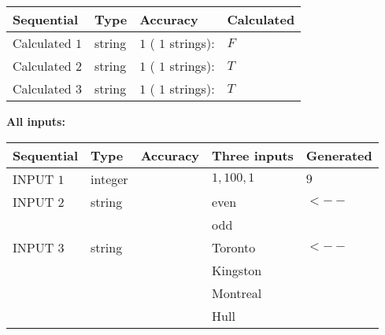 \documentclass[12pt]{article}
\begin{document}
   
   
   
\noindent{}
   
   
  
  
\noindent\begin{tabular}{|l|l|l|l|}
\hline
 Sequential & Type & Accuracy & Calculated \\ 
\hline
 
 
  Calculated $            1 $ & string & $            1  $ ( $           1  $ strings): 
 & $F$
 \\  \hline  
 
 
  Calculated $            2 $ & string & $            1  $ ( $           1  $ strings): 
 & $T$
 \\  \hline  
 
 
  Calculated $            3 $ & string & $            1  $ ( $           1  $ strings): 
 & $T$
 \\  \hline  
 \end{tabular}
   
   
   
   
\noindent\vspace{0.1in}\hspace{-0.08in} {\textbf{\Large{All inputs: }}}
   
   
  
  
\noindent\begin{tabular}{|l|l|l|l|l|}
\hline
 Sequential & Type & Accuracy & Three inputs & Generated \\ 
\hline
 
 
  INPUT $            1 $ & integer &  & $
 1
 , 
 100
 , 
 1
 $ & $ 9 $ 
 \\  \hline  
 
 
  INPUT $            2 $ & string & & 
 even & 
  $ <-- $ 
  \\
  & & & 
 odd & 
 \\  \hline  
 
 
  INPUT $            3 $ & string & & 
 Toronto & 
  $ <-- $ 
  \\
  & & & 
 Kingston & 
  \\
  & & & 
 Montreal & 
  \\
  & & & 
 Hull & 
 \\  \hline  
 \end{tabular}
   
   
  
\end{document}

